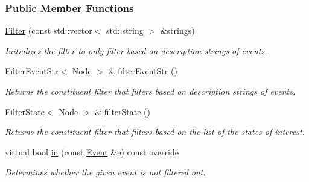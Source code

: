 \subsubsection*{Public Member Functions}
\begin{DoxyCompactItemize}
\item 
\hyperlink{structslb_1_1core_1_1ui_1_1Filter_a83a648e702ab05ad75651b7e47b1e4a0}{Filter} (const std\+::vector$<$ std\+::string $>$ \&strings)\hypertarget{structslb_1_1core_1_1ui_1_1Filter_a83a648e702ab05ad75651b7e47b1e4a0}{}\label{structslb_1_1core_1_1ui_1_1Filter_a83a648e702ab05ad75651b7e47b1e4a0}

\begin{DoxyCompactList}\small\item\em Initializes the filter to only filter based on description strings of events. \end{DoxyCompactList}\item 
\hyperlink{structslb_1_1core_1_1ui_1_1FilterEventStr}{Filter\+Event\+Str}$<$ Node $>$ \& \hyperlink{structslb_1_1core_1_1ui_1_1Filter_a6682eb7f1f16cbac241433ba765ca3e7}{filter\+Event\+Str} ()
\begin{DoxyCompactList}\small\item\em Returns the constituent filter that filters based on description strings of events. \end{DoxyCompactList}\item 
\hyperlink{structslb_1_1core_1_1ui_1_1FilterState}{Filter\+State}$<$ Node $>$ \& \hyperlink{structslb_1_1core_1_1ui_1_1Filter_a3eefa14ffdef3dd5bc1541356b3b37eb}{filter\+State} ()
\begin{DoxyCompactList}\small\item\em Returns the constituent filter that filters based on the list of the states of interest. \end{DoxyCompactList}\item 
virtual bool \hyperlink{structslb_1_1core_1_1ui_1_1Filter_a847ebebdfe826a3d0c26a52b13e1ba26}{in} (const \hyperlink{structslb_1_1core_1_1ui_1_1FilterBase_a4cf70d819855984dc0e15a036e8b8a14}{Event} \&e) const override
\begin{DoxyCompactList}\small\item\em Determines whether the given event is not filtered out. \end{DoxyCompactList}\end{DoxyCompactItemize}
